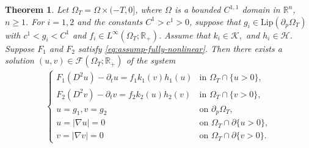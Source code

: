 \documentclass[11pt,oneside,english]{amsart}
\newcommand{\R}{{\mathbb R}}
\newcommand{\cK}{{\mathcal K}}
\newcommand{\cH}{{\mathcal H}}
\newcommand{\cF}{{\mathcal F}}
\newcommand{\D}{\nabla}
\numberwithin{equation}{section}
\newtheorem{theorem}{Theorem}
\theoremstyle{plain}
\numberwithin{equation}{section}
\begin{document}
\begin{theorem}
    \label{thm:FNpar}
    Let $\Omega_T = \Omega \times (-T,0]$, where 
    $\Omega$ is a bounded $C^{1,1}$ domain in $\R^n$, $n\ge1 $. For $i=1,2$ and the  constants $C^1>c^1>0$, suppose that $g_i\in\text{Lip}(\partial_p\Omega_T)$ with $c^1<g_i<C^1$ and $f_i\in L^\infty(\Omega_T;\R_+)$. Assume that $k_i \in \cK,$ and $h_i\in \cH $. Suppose $F_1$ and $F_2$ satisfy \eqref{eq:assump-fully-nonlinear}. Then there exists a solution $(u,v)\in \cF(\Omega_T;\R_+)$ of the system
    \begin{align}\label{sys:FNpar}
        \begin{cases}
            F_1(D^2u) - \partial_t u= f_1k_1(v)h_1(u)&\text{in }\Omega_T\cap\{u>0\},\\
            F_2(D^2v) - \partial_t v =f_2k_2(u)h_2(v)&\text{in }\Omega_T\cap\{v>0\},\\
            u=g_1,v=g_2&\text{on }\partial_p\Omega_T,\\
            u=|\D u|=0&\text{on }\Omega_T\cap\partial\{u>0\},\\
            v=|\D v|=0&\text{on }\Omega_T\cap\partial\{v>0\}.
        \end{cases}
    \end{align}
\end{theorem}
\end{document}
